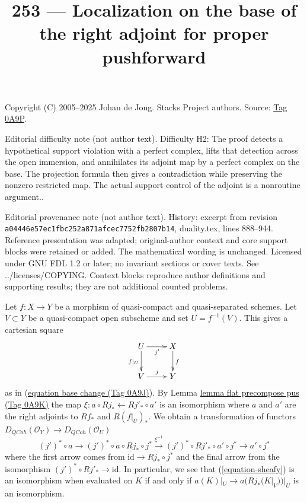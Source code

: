 \documentclass{amsart}
\theoremstyle{plain}
\theoremstyle{definition}
\theoremstyle{remark}
\numberwithin{equation}{subsection}
\def\QCoh{\mathit{QCoh}}
\begin{document}
\title[Stacks Project, Tag 0A9P]{253 --- Localization on the base of the right adjoint for proper pushforward}
\maketitle
\noindent Copyright (C) 2005--2025 Johan de Jong. Stacks Project authors. Source: \href{https://stacks.math.columbia.edu/tag/0A9P}{Tag 0A9P}.

\noindent Editorial difficulty note (not author text). Difficulty H2: The proof detects a hypothetical support violation with a perfect complex, lifts that detection across the open immersion, and annihilates its adjoint map by a perfect complex on the base. The projection formula then gives a contradiction while preserving the nonzero restricted map. The actual support control of the adjoint is a nonroutine argument..

\noindent Editorial provenance note (not author text). History: excerpt from revision \texttt{a0444\allowbreak 6e57e\allowbreak c1fbc\allowbreak 252a8\allowbreak 71afc\allowbreak ec775\allowbreak 2fb28\allowbreak 07b14}, duality.tex, lines 888--944. Reference presentation was adapted; original-author context and core support blocks were retained or added. The mathematical wording is unchanged. Licensed under GNU FDL 1.2 or later; no invariant sections or cover texts. See ../licenses/COPYING. Context blocks reproduce author definitions and supporting results; they are not additional counted problems.

\noindent
Let $f : X \to Y$ be a morphism of quasi-compact and quasi-separated
schemes. Let $V \subset Y$ be a quasi-compact open subscheme and set
$U = f^{-1}(V)$. This gives a cartesian square
$$
\xymatrix{
U \ar[r]_{j'} \ar[d]_{f|_U} & X \ar[d]^f \\
V \ar[r]^j & Y
}
$$
as in (\href{https://stacks.math.columbia.edu/tag/0A9J}{equation base change (Tag 0A9J)}). By Lemma \href{https://stacks.math.columbia.edu/tag/0A9K}{lemma flat precompose pus (Tag 0A9K)}
the map $\xi : a \circ Rj_* \leftarrow Rj'_* \circ a'$ is an isomorphism
where $a$ and $a'$ are the right adjoints to
$Rf_*$ and $R(f|_U)_*$. We obtain a transformation
of functors $D_\QCoh(\mathcal{O}_Y) \to D_\QCoh(\mathcal{O}_U)$
\begin{equation}
\label{equation-sheafy}
(j')^* \circ a \to
(j')^* \circ a \circ Rj_* \circ j^* \xrightarrow{\xi^{-1}}
(j')^* \circ Rj'_* \circ a' \circ j^* \to a' \circ j^*
\end{equation}
where the first arrow comes from $\text{id} \to Rj_* \circ j^*$
and the final arrow from the isomorphism $(j')^* \circ Rj'_* \to \text{id}$.
In particular, we see that (\ref{equation-sheafy}) is an isomorphism
when evaluated on $K$ if and only if $a(K)|_U \to a(Rj_*(K|_V))|_U$
is an isomorphism.
\end{document}
